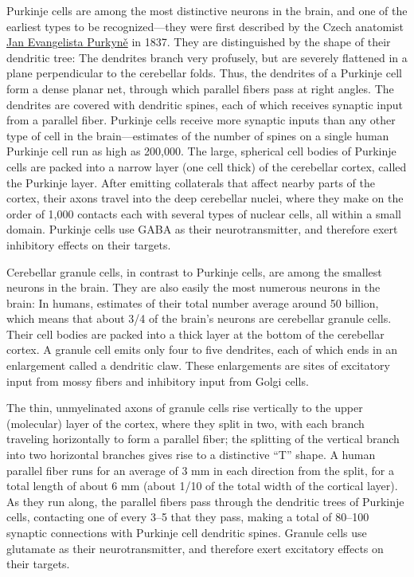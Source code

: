 Purkinje cells are among the most distinctive neurons in the brain, and one of the earliest types to be recognized---they were first described by the Czech anatomist \href{https://en.wikipedia.org/wiki/Jan_Evangelista_Purkyně}{Jan Evangelista Purkyně} in 1837. They are distinguished by the shape of their dendritic tree: The dendrites branch very profusely, but are severely flattened in a plane perpendicular to the cerebellar folds. Thus, the dendrites of a Purkinje cell form a dense planar net, through which parallel fibers pass at right angles. The dendrites are covered with dendritic spines, each of which receives synaptic input from a parallel fiber. Purkinje cells receive more synaptic inputs than any other type of cell in the brain---estimates of the number of spines on a single human Purkinje cell run as high as 200,000. The large, spherical cell bodies of Purkinje cells are packed into a narrow layer (one cell thick) of the cerebellar cortex, called the Purkinje layer. After emitting collaterals that affect nearby parts of the cortex, their axons travel into the deep cerebellar nuclei, where they make on the order of 1,000 contacts each with several types of nuclear cells, all within a small domain. Purkinje cells use GABA as their neurotransmitter, and therefore exert inhibitory effects on their targets.

Cerebellar granule cells, in contrast to Purkinje cells, are among the smallest neurons in the brain. They are also easily the most numerous neurons in the brain: In humans, estimates of their total number average around 50 billion, which means that about 3/4 of the brain's neurons are cerebellar granule cells. Their cell bodies are packed into a thick layer at the bottom of the cerebellar cortex. A granule cell emits only four to five dendrites, each of which ends in an enlargement called a dendritic claw. These enlargements are sites of excitatory input from mossy fibers and inhibitory input from Golgi cells.

The thin, unmyelinated axons of granule cells rise vertically to the upper (molecular) layer of the cortex, where they split in two, with each branch traveling horizontally to form a parallel fiber; the splitting of the vertical branch into two horizontal branches gives rise to a distinctive ``T'' shape. A human parallel fiber runs for an average of 3 mm in each direction from the split, for a total length of about 6 mm (about 1/10 of the total width of the cortical layer). As they run along, the parallel fibers pass through the dendritic trees of Purkinje cells, contacting one of every 3--5 that they pass, making a total of 80--100 synaptic connections with Purkinje cell dendritic spines. Granule cells use glutamate as their neurotransmitter, and therefore exert excitatory effects on their targets.

